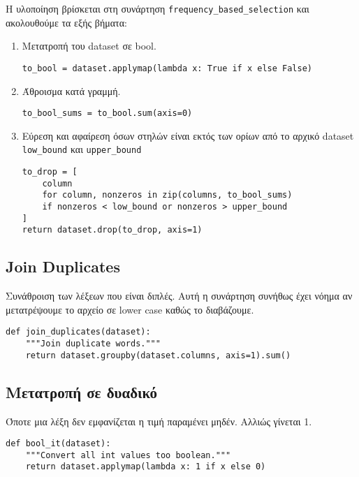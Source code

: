 Η υλοποίηση βρίσκεται στη συνάρτηση \lstinline!frequency_based_selection! και ακολουθούμε τα εξής βήματα:
\begin{enumerate}
\item Μετατροπή του dataset σε bool.
\begin{lstlisting}[numbers=none, aboveskip=\smallskipamount, belowskip=\smallskipamount, captionpos=none]
to_bool = dataset.applymap(lambda x: True if x else False)
\end{lstlisting}

\item Άθροισμα κατά γραμμή.
\begin{lstlisting}[numbers=none, aboveskip=\smallskipamount, belowskip=\smallskipamount, captionpos=none]
to_bool_sums = to_bool.sum(axis=0)
\end{lstlisting}

\item Εύρεση και αφαίρεση όσων στηλών είναι εκτός των ορίων από το αρχικό dataset \lstinline!low_bound! και \lstinline!upper_bound!
\begin{lstlisting}[numbers=none, aboveskip=\smallskipamount, belowskip=\smallskipamount, captionpos=none]
to_drop = [
    column
    for column, nonzeros in zip(columns, to_bool_sums)
    if nonzeros < low_bound or nonzeros > upper_bound
]
return dataset.drop(to_drop, axis=1)
\end{lstlisting}
\end{enumerate}

\subsection{Join Duplicates}
Συνάθροιση των λέξεων που είναι διπλές.
Αυτή η συνάρτηση συνήθως έχει νόημα αν μετατρέψουμε το αρχείο σε lower case καθώς το διαβάζουμε.
\begin{lstlisting}[captionpos=none, numbers=none]
def join_duplicates(dataset):
    """Join duplicate words."""
    return dataset.groupby(dataset.columns, axis=1).sum()
\end{lstlisting}

\subsection{Μετατροπή σε δυαδικό}
Όποτε μια λέξη δεν εμφανίζεται η τιμή παραμένει μηδέν.
Αλλιώς γίνεται 1.
\begin{lstlisting}[captionpos=none, numbers=none]
def bool_it(dataset):
    """Convert all int values too boolean."""
    return dataset.applymap(lambda x: 1 if x else 0)
\end{lstlisting}
